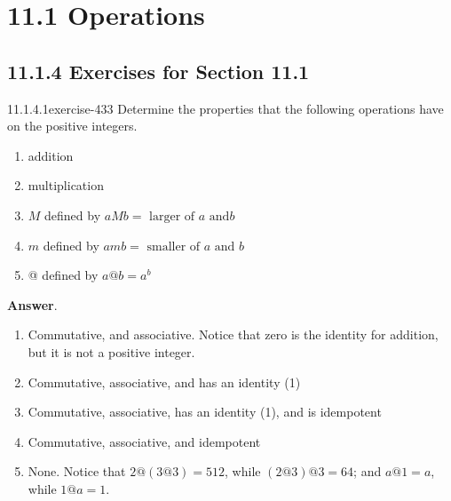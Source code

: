 \documentclass[twoside,10pt,]{book}
\numberwithin{equation}{section}
\begin{document}
\section*{11.1 Operations}
\subsection*{11.1.4 Exercises for Section 11.1}
\begin{divisionsolution}{11.1.4.1}{}{exercise-433}%
\hypertarget{p-3795}{}%
Determine the properties that the following operations have on the positive integers.\leavevmode%
\begin{enumerate}[label=(\alph*)]
\item\hypertarget{li-1733}{}\hypertarget{p-3796}{}%
addition%
\item\hypertarget{li-1734}{}\hypertarget{p-3797}{}%
multiplication%
\item\hypertarget{li-1735}{}\hypertarget{p-3798}{}%
\(M\) defined by \(a M b = \textrm{ larger} \textrm{ of } a \textrm{ and} b\)%
\item\hypertarget{li-1736}{}\hypertarget{p-3799}{}%
\(m\) defined by \(a m b = \textrm{ smaller} \textrm{ of } a \textrm{ and } b\)%
\item\hypertarget{li-1737}{}\hypertarget{p-3800}{}%
@ defined by \(a @ b = a^b\)%
\end{enumerate}
%
\par\smallskip%
\noindent\textbf{Answer}.\quad%
\hypertarget{p-3801}{}%
\leavevmode%
\begin{enumerate}[label=(\alph*)]
\item\hypertarget{li-1738}{}\hypertarget{p-3802}{}%
Commutative, and associative. Notice that zero is the identity for addition, but it is not a positive integer.%
\item\hypertarget{li-1739}{}\hypertarget{p-3803}{}%
Commutative, associative, and has an  identity (1)%
\item\hypertarget{li-1740}{}\hypertarget{p-3804}{}%
Commutative, associative, has an identity (1), and is idempotent%
\item\hypertarget{li-1741}{}\hypertarget{p-3805}{}%
Commutative, associative, and idempotent%
\item\hypertarget{li-1742}{}\hypertarget{p-3806}{}%
None. Notice that   \(2 @ (3 @ 3) = 512\), while \((2 @ 3) @ 3 = 64\); and \(a @ 1 = a\), while \(1 @ a = 1\).%
\end{enumerate}
%
\end{divisionsolution}%
\end{document}
